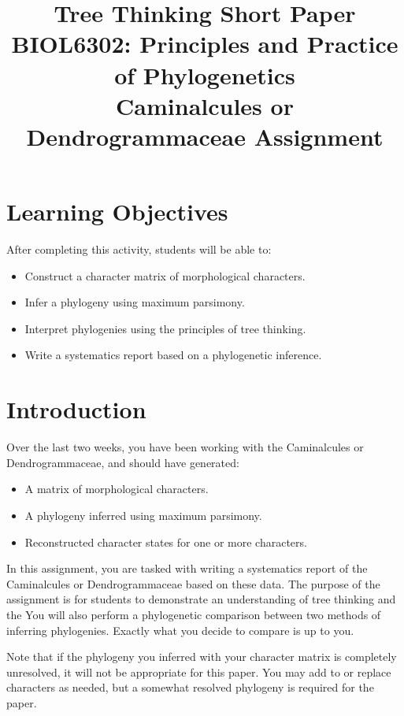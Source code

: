 \documentclass[12pt]{article}
\title{Tree Thinking Short Paper\\ \large BIOL6302: Principles and Practice of Phylogenetics \\ Caminalcules or Dendrogrammaceae Assignment \vspace{-3em}}
\begin{document}
\maketitle

\section{Learning Objectives}

After completing this activity, students will be able to:

\begin{itemize}
\itemsep0em
\item Construct a character matrix of morphological characters.
\item Infer a phylogeny using maximum parsimony.
\item Interpret phylogenies using the principles of tree thinking.
\item Write a systematics report based on a phylogenetic inference.
\end{itemize}

\section{Introduction}

Over the last two weeks, you have been working with the Caminalcules or Dendrogrammaceae, and should have generated:
\begin{itemize}
\itemsep0em
\item A matrix of morphological characters.
\item A phylogeny inferred using maximum parsimony.
\item Reconstructed character states for one or more characters.
\end{itemize}

In this assignment, you are tasked with writing a systematics report of the Caminalcules or Dendrogrammaceae based on these data. 
The purpose of the assignment is for students to demonstrate an understanding of tree thinking and the 
You will also perform a phylogenetic comparison between two methods of inferring phylogenies.
Exactly what you decide to compare is up to you.

Note that if the phylogeny you inferred with your character matrix is completely unresolved, it will not be appropriate for this paper. 
You may add to or replace characters as needed, but a somewhat resolved phylogeny is required for the paper.
\end{document}
